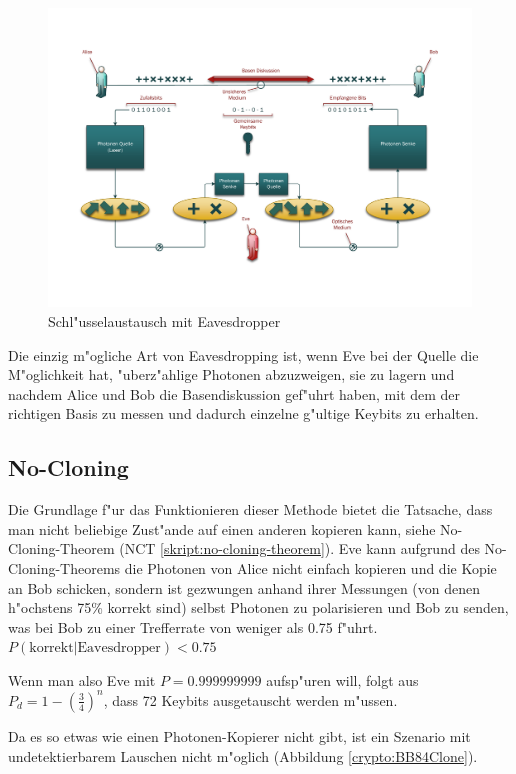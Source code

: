   \begin{figure}
    \centering
    \includegraphics[height=0.45\textheight]{crypto/BB84Eve.pdf}
    \caption{Schl"usselaustausch mit Eavesdropper\label{crypto:BB84Eve}}
  \end{figure}

  Die einzig m"ogliche Art von Eavesdropping ist, wenn Eve bei der Quelle die M"oglichkeit hat, "uberz"ahlige Photonen abzuzweigen,
  sie zu lagern und nachdem Alice und Bob die Basendiskussion gef"uhrt haben,
  mit dem der richtigen Basis zu messen und dadurch einzelne g"ultige Keybits zu erhalten.

  \subsection{No-Cloning}
  Die Grundlage f"ur das Funktionieren dieser Methode bietet die Tatsache, dass man nicht beliebige Zust"ande auf einen anderen kopieren kann, siehe No-Cloning-Theorem (NCT \ref{skript:no-cloning-theorem}).
  Eve kann aufgrund des No-Cloning-Theorems die Photonen von Alice nicht einfach kopieren und die Kopie an Bob schicken,
  sondern ist gezwungen anhand ihrer Messungen (von denen h"ochstens 75\% korrekt sind) selbst Photonen zu polarisieren
  und Bob zu senden, was bei Bob zu einer Trefferrate von weniger als 0.75 f"uhrt.
  $P(\text{korrekt}|\text{Eavesdropper})<0.75$

  Wenn man also Eve mit $P=0.999999999$ aufsp"uren will,
  folgt aus $P_d = 1 - \left(\frac{3}{4}\right)^n$,
  dass 72 Keybits ausgetauscht werden m"ussen.

  Da es so etwas wie einen Photonen-Kopierer nicht gibt, ist ein Szenario mit undetektierbarem Lauschen nicht m"oglich (Abbildung \ref{crypto:BB84Clone}).

